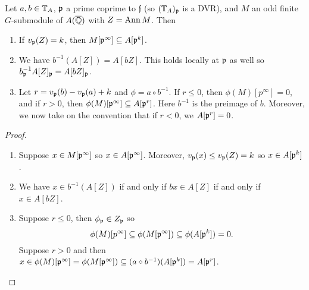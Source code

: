 \documentclass{article}
\renewcommand{\f}{\mathfrak{f}}
\begin{document}
\begin{lemma}\label{lem:com_alg}
    Let $a,b\in \mathbb{T}_A$, $\mathfrak{p}$ a prime coprime to $\f$ (so $(\mathbb{T}_A)_{\mathfrak{p}}$ is a
    DVR), and $M$ an odd finite $G$-submodule of $A(\overline{\mathbb{Q}})$ with $Z=\operatorname{Ann} M$.
    Then
    \begin{enumerate}
        \item 
            If $v_{\mathfrak{p}}(Z) = k$, then $M[\mathfrak{p}^\infty]\subseteq A[\mathfrak{p}^k]$.
        \item
            We have $b^{-1}(A[Z])=A[bZ]$. This holds locally at $\mathfrak{p}$ as well so
            $b_{\mathfrak{p}} ^{-1} A[Z]_{\mathfrak{p}} = A[bZ]_{\mathfrak{p}}$.
        \item
            Let $r=v_{\mathfrak{p}}(b)-v_{\mathfrak{p}}(a)+k$ and $\phi=a\circ b^{-1}$. If $r\leq
            0$, then $\phi(M)[p^\infty]=0$, and if $r>0$, then
            $\phi(M)[\mathfrak{p}^\infty]\subseteq A[\mathfrak{p}^r]$. Here $b^{-1}$ is the
            preimage of $b$. Moreover, we now take on the convention that if
            $r<0$, we $A[\mathfrak{p}^r]=0$.
    \end{enumerate}
\end{lemma}
\begin{proof}
    \mbox{}
    \begin{enumerate}
        \item 
            Suppose $x\in M[\mathfrak{p}^\infty]$ so $x\in A[\mathfrak{p}^\infty]$. Moreover,
            $v_{\mathfrak{p}}(x) \leq v_{\mathfrak{p}}(Z) = k$ so $x\in A[\mathfrak{p}^k]$.
        \item
            We have $x\in b^{-1}(A[Z])$ if and only if $bx \in A[Z]$ if and
            only if $x\in A[bZ]$.
        \item
            Suppose $r\leq 0$, then $\phi_{\mathfrak{p}} \in Z_{\mathfrak{p}}$ so
            \[
                \phi(M)[p^\infty]\subseteq \phi(M[\mathfrak{p}^\infty])
                \subseteq \phi(A[\mathfrak{p}^k]) = 0.
            \]
            Suppose $r>0$ and then $x\in \phi(M)[\mathfrak{p}^\infty] =
            \phi(M[\mathfrak{p}^\infty])\subseteq (a\circ
            b^{-1})(A[\mathfrak{p}^k])=A[\mathfrak{p}^r]$.
    \end{enumerate}
\end{proof}
\end{document}
